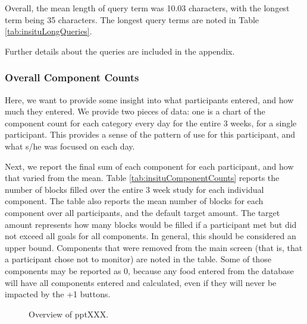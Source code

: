 Overall, the mean length of query term was 10.03 characters, with the longest term being 35 characters. The longest query terms are noted in Table \ref{tab:insituLongQueries}.

Further details about the queries are included in the appendix. 


\subsubsection{Overall Component Counts}
Here, we want to provide some insight into what participants entered, and how much they entered. We provide two pieces of data: one is a chart of the component count for each category every day for the entire 3 weeks, for a single participant. This provides a sense of the pattern of use for this participant, and what s/he was focused on each day. 

Next, we report the final sum of each component for each participant, and how that varied from the mean. Table \ref{tab:insituComponentCounts} reports the number of blocks filled over the entire 3 week study for each individual component. The table also reports the mean number of blocks for each component over all participants, and the default target amount. The target amount represents how many blocks would be filled if a participant met but did not exceed all goals for all components. In general, this should be considered an upper bound. Components that were removed from the main screen (that is, that a participant chose not to monitor) are noted in the table. Some of those components may be reported as 0, because any food entered from the database will have all components entered and calculated, even if they will never be impacted by the +1 buttons. 



\begin{figure}[ h ]
\begin{center}
\setlength\fboxsep{0pt}
\setlength\fboxrule{0.5pt}
\label{fig:ppt_overview}

\caption{Overview of pptXXX.}
\end{center}
\end{figure}


